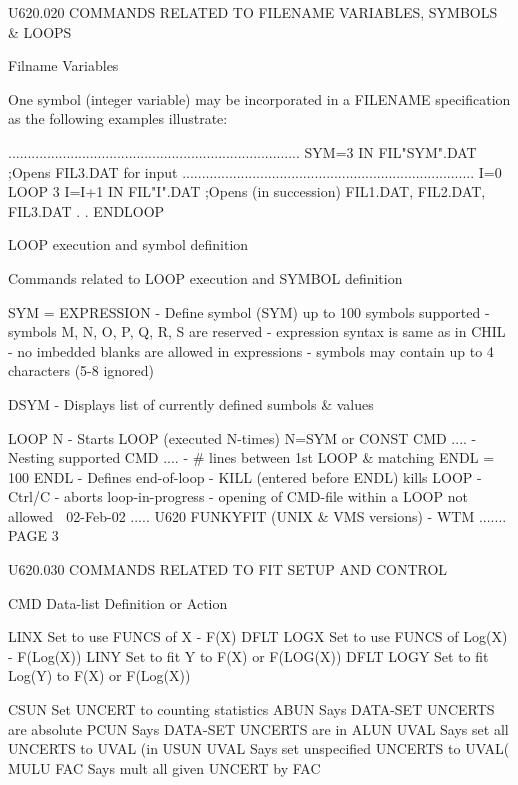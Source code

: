  
 
   U620.020  COMMANDS RELATED TO FILENAME VARIABLES, SYMBOLS & LOOPS
 
   Filname Variables
 
   One  symbol  (integer  variable)  may  be  incorporated   in   a   FILENAME
   specification as the following examples illustrate:
 
   ...........................................................................
   SYM=3
   IN FIL"SYM".DAT   ;Opens FIL3.DAT for input
   ...........................................................................
   I=0
   LOOP 3
   I=I+1
   IN  FIL"I".DAT   ;Opens (in succession)  FIL1.DAT, FIL2.DAT, FIL3.DAT
   .
   .
   ENDLOOP
 
   LOOP execution and symbol definition
 
 
   Commands related to LOOP execution and SYMBOL definition
 
   SYM = EXPRESSION - Define symbol (SYM) up to 100 symbols supported
                    - symbols M, N, O, P, Q, R, S are reserved
                    - expression syntax is same as in CHIL
                    - no imbedded blanks are allowed in expressions
                    - symbols may contain up to 4 characters (5-8 ignored)
 
   DSYM             - Displays list of currently defined sumbols & values
 
   LOOP N           - Starts LOOP (executed N-times) N=SYM or CONST
   CMD  ....        - Nesting supported
   CMD  ....        - # lines between 1st LOOP & matching ENDL = 100
   ENDL             - Defines end-of-loop
                    - KILL (entered before ENDL) kills LOOP
                    - Ctrl/C - aborts loop-in-progress
                    - opening of CMD-file within a LOOP not allowed
    
   02-Feb-02 ..... U620  FUNKYFIT (UNIX & VMS versions) - WTM ....... PAGE   3
 
 
   U620.030  COMMANDS RELATED TO FIT SETUP AND CONTROL
 
   CMD  Data-list   Definition or Action
 
   LINX             Set to use FUNCS of X - F(X)      DFLT
   LOGX             Set to use FUNCS of Log(X) - F(Log(X))
   LINY             Set to fit Y to F(X) or F(LOG(X)) DFLT
   LOGY             Set to fit Log(Y) to F(X) or F(Log(X))
 
   CSUN             Set UNCERT to counting statistics
   ABUN             Says DATA-SET UNCERTS are absolute
   PCUN             Says DATA-SET UNCERTS are in %
   ALUN UVAL        Says set all UNCERTS to UVAL (in %
   USUN UVAL        Says set unspecified UNCERTS to UVAL(%
   MULU FAC         Says mult all given UNCERT by FAC
 
